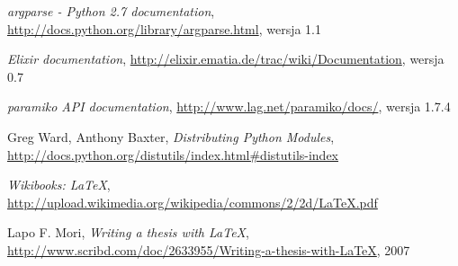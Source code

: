 \documentclass[00-praca-magisterska.tex]{subfiles}
\begin{document}
\begin{thebibliography}{9}
  \emph{argparse - Python 2.7 documentation},
  \url{http://docs.python.org/library/argparse.html},
  wersja 1.1

  \emph{Elixir documentation},
  \url{http://elixir.ematia.de/trac/wiki/Documentation},
  wersja 0.7


  \emph{paramiko API documentation},
  \url{http://www.lag.net/paramiko/docs/},
  wersja 1.7.4

  Greg Ward, Anthony Baxter,
  \emph{Distributing Python Modules},
  \url{http://docs.python.org/distutils/index.html#distutils-index}

  \emph{Wikibooks: \LaTeX},
  \url{http://upload.wikimedia.org/wikipedia/commons/2/2d/LaTeX.pdf}

  Lapo F. Mori, 
  \emph{Writing a thesis with \LaTeX},
  \url{http://www.scribd.com/doc/2633955/Writing-a-thesis-with-LaTeX},
  2007

\end{thebibliography}


\end{document}
